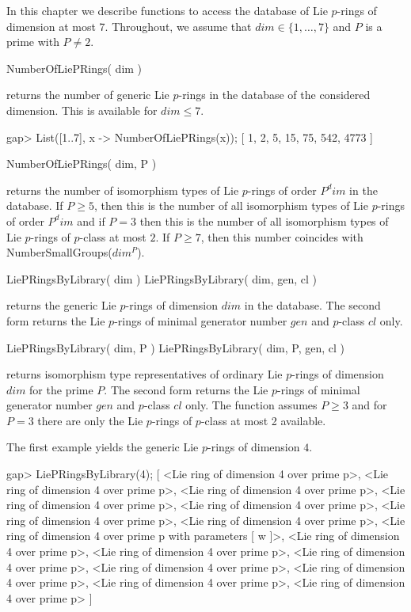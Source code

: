 

In this chapter we describe functions to access the database of Lie $p$-rings
of dimension at most $7$. Throughout, we assume that $dim \in \{1, \ldots, 7\}$
and $P$ is a prime with $P \neq 2$.


\> NumberOfLiePRings( dim )

returns the number of generic Lie $p$-rings in the database of the 
considered dimension. This is available for $dim \leq 7$.

\beginexample
gap> List([1..7], x -> NumberOfLiePRings(x));
[ 1, 2, 5, 15, 75, 542, 4773 ]
\endexample

\> NumberOfLiePRings( dim, P )

returns the number of isomorphism types of Lie $p$-rings of order $P^dim$
in the database. If $P \geq 5$, then this is the number of all isomorphism
types of Lie $p$-rings of order $P^dim$ and if $P = 3$ then this is the
number of all isomorphism types of Lie $p$-rings of $p$-class at most $2$.
If $P \geq 7$, then this number coincides with NumberSmallGroups($dim^P$).


\> LiePRingsByLibrary( dim )
\> LiePRingsByLibrary( dim, gen, cl )

returns the generic Lie $p$-rings of dimension $dim$ in the database. The
second form returns the Lie $p$-rings of minimal generator number $gen$ 
and $p$-class $cl$ only. 

\> LiePRingsByLibrary( dim, P )
\> LiePRingsByLibrary( dim, P, gen, cl )

returns isomorphism type representatives of ordinary Lie $p$-rings of 
dimension $dim$ for the prime $P$. The second form returns the Lie $p$-rings 
of minimal generator number $gen$ and $p$-class $cl$ only. The function 
assumes $P \geq 3$ and for $P = 3$ there are only the Lie $p$-rings of 
$p$-class at most 2 available.

The first example yields the generic Lie $p$-rings of dimension $4$.

\beginexample
gap> LiePRingsByLibrary(4);
[ <Lie ring of dimension 4 over prime p>, 
  <Lie ring of dimension 4 over prime p>, 
  <Lie ring of dimension 4 over prime p>, 
  <Lie ring of dimension 4 over prime p>, 
  <Lie ring of dimension 4 over prime p>, 
  <Lie ring of dimension 4 over prime p>, 
  <Lie ring of dimension 4 over prime p>, 
  <Lie ring of dimension 4 over prime p with parameters [ w ]>, 
  <Lie ring of dimension 4 over prime p>, 
  <Lie ring of dimension 4 over prime p>, 
  <Lie ring of dimension 4 over prime p>, 
  <Lie ring of dimension 4 over prime p>, 
  <Lie ring of dimension 4 over prime p>, 
  <Lie ring of dimension 4 over prime p>, 
  <Lie ring of dimension 4 over prime p> ]
\endexample


